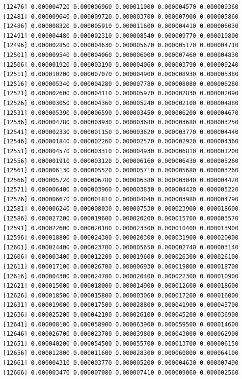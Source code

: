 \documentclass[]{article}
\begin{document}
\begin{verbatim}
[12476] 0.000004720 0.000006960 0.000011000 0.000004570 0.000009360
[12481] 0.000009640 0.000009720 0.000003700 0.000007900 0.000005860
[12486] 0.000008320 0.000005910 0.000011600 0.000004410 0.000006030
[12491] 0.000004480 0.000002310 0.000008540 0.000009770 0.000010800
[12496] 0.000002850 0.000004630 0.000005670 0.000005170 0.000004710
[12501] 0.000009540 0.000004060 0.000006000 0.000007460 0.000004830
[12506] 0.000001920 0.000003190 0.000004060 0.000003790 0.000009240
[12511] 0.000010200 0.000007070 0.000004900 0.000008930 0.000005380
[12516] 0.000005340 0.000004280 0.000007780 0.000008080 0.000006280
[12521] 0.000002600 0.000004110 0.000005970 0.000002830 0.000002090
[12526] 0.000003050 0.000004360 0.000005240 0.000002100 0.000004880
[12531] 0.000005390 0.000006590 0.000003450 0.000006200 0.000004670
[12536] 0.000004780 0.000003930 0.000003680 0.000003680 0.000003250
[12541] 0.000002330 0.000001150 0.000003620 0.000003770 0.000004440
[12546] 0.000001840 0.000002260 0.000002570 0.000002920 0.000004360
[12551] 0.000004570 0.000003310 0.000004930 0.000006810 0.000001200
[12556] 0.000001910 0.000003120 0.000006160 0.000006430 0.000005260
[12561] 0.000006130 0.000005520 0.000005710 0.000005680 0.000003260
[12566] 0.000005720 0.000006780 0.000006380 0.000003040 0.000004420
[12571] 0.000006400 0.000003960 0.000003830 0.000004420 0.000005220
[12576] 0.000006670 0.000001810 0.000004040 0.000003980 0.000004790
[12581] 0.000006240 0.000008030 0.000007530 0.000023900 0.000018600
[12586] 0.000027200 0.000019600 0.000020200 0.000015700 0.000003570
[12591] 0.000022600 0.000020100 0.000023300 0.000010400 0.000013900
[12596] 0.000018800 0.000024300 0.000020300 0.000031900 0.000020000
[12601] 0.000024400 0.000023700 0.000005650 0.000002740 0.000003140
[12606] 0.000003400 0.000012200 0.000019600 0.000026300 0.000026100
[12611] 0.000017100 0.000026700 0.000006930 0.000019800 0.000018700
[12616] 0.000004300 0.000024700 0.000020400 0.000022300 0.000010900
[12621] 0.000015000 0.000018000 0.000014900 0.000012600 0.000018600
[12626] 0.000018500 0.000015800 0.000003060 0.000017200 0.000016000
[12631] 0.000019000 0.000017500 0.000028800 0.000041900 0.000045700
[12636] 0.000025200 0.000042100 0.000026100 0.000045200 0.000036900
[12641] 0.000008100 0.000058900 0.000063900 0.000059500 0.000014600
[12646] 0.000026700 0.000023700 0.000039800 0.000043000 0.000062900
[12651] 0.000040200 0.000054500 0.000055700 0.000013700 0.000006150
[12656] 0.000012800 0.000011600 0.000028300 0.000060800 0.000064100
[12661] 0.000004310 0.000003770 0.000005200 0.000004630 0.000007490
[12666] 0.000003470 0.000007080 0.000007410 0.000009060 0.000002560

\end{verbatim}
\end{document}
